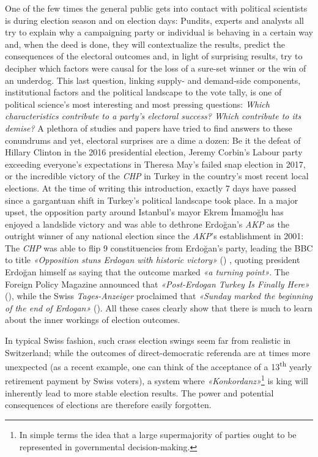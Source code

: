 \documentclass[11pt,a4paper]{article}
\begin{document}
One of the few times the general public gets into contact with political scientists is during election season and on election days: Pundits, experts and analysts all try to explain why a campaigning party or individual is behaving in a certain way and, when the deed is done, they will contextualize the results, predict the consequences of the electoral outcomes and, in light of surprising results, try to decipher which factors were causal for the loss of a sure-set winner or the win of an underdog. This last question, linking supply- and demand-side components, institutional factors and the political landscape to the vote tally, is one of political science’s most interesting and most pressing questions: \textit{Which characteristics contribute to a party’s electoral success? Which contribute to its demise?} A plethora of studies and papers have tried to find answers to these conundrums and yet, electoral surprises are a dime a dozen: Be it the defeat of Hillary Clinton in the 2016 presidential election, Jeremy Corbin’s Labour party exceeding everyone’s expectations in Theresa May’s failed snap election in 2017, or the incredible victory of the \textit{CHP} in Turkey in the country’s most recent local elections. At the time of writing this introduction, exactly 7 days have passed since a gargantuan shift in Turkey’s political landscape took place. In a major upset, the opposition party around Istanbul’s mayor Ekrem İmamoğlu has enjoyed a landslide victory and was able to dethrone Erdoğan’s \textit{AKP} as the outright winner of any national election since the \textit{AKP}’s establishment in 2001: The \textit{CHP }was able to flip 9 constituencies from Erdoğan’s party, leading the BBC to title \textit{«Opposition stuns Erdogan with historic victory»} (\cite{kirby_turkish_2024}) , quoting president Erdoğan himself as saying that the outcome marked \textit{«a turning point»}. The Foreign Policy Magazine announced that \textit{«Post-Erdogan Turkey Is Finally Here»} (\cite{cook_post-erdogan_2024}), while the Swiss \textit{Tages-Anzeiger} proclaimed that \textit{«Sunday marked the beginning of the end of Erdogan»} (\cite{geiger_kommentar_2024}). All these cases clearly show that there is much to learn about the inner workings of election outcomes.

In typical Swiss fashion, such crass election swings seem far from realistic in Switzerland; while the outcomes of direct-democratic referenda are at times more unexpected (as a recent example, one can think of the acceptance of a 13\textsuperscript{th} yearly retirement payment by Swiss voters), a system where \textit{«Konkordanz»}\footnote{In simple terms the idea that a large supermajority of parties ought to be represented in governmental decision-making.} is king will inherently lead to more stable election results. The power and potential consequences of elections are therefore easily forgotten.
\end{document}

